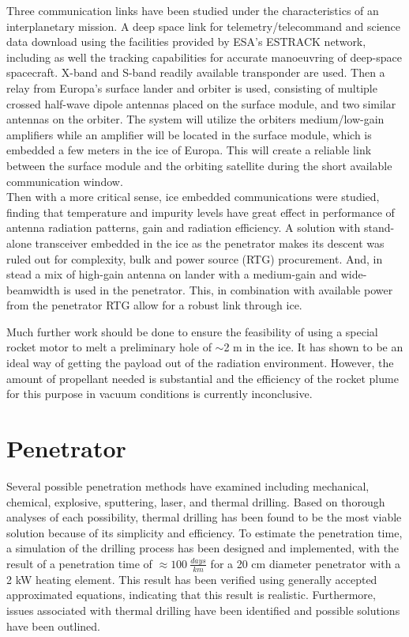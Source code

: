 Three communication links have been studied under the characteristics of an interplanetary mission. A deep space link for telemetry/telecommand and science data download using the facilities provided by ESA's ESTRACK network, including as well the tracking capabilities for accurate manoeuvring of deep-space spacecraft. X-band and S-band readily available transponder are used. Then a relay from Europa's surface lander and orbiter is used, consisting of multiple crossed half-wave dipole antennas placed on the surface module, and two similar antennas on the orbiter. The system will utilize the orbiters medium/low-gain amplifiers while an amplifier will be located in the surface module, which is embedded a few meters in the ice of Europa. This will create a reliable link between the surface module and the orbiting satellite during the short available communication window.
\\
Then with a more critical sense, ice embedded communications were studied, finding that temperature and impurity levels have great effect in performance of antenna radiation patterns, gain and radiation efficiency. A solution with stand-alone transceiver embedded in the ice as the penetrator makes its descent was ruled out for complexity, bulk and power source (RTG) procurement. And, in stead a mix of high-gain antenna on lander with a medium-gain and wide-beamwidth is used in the penetrator. This, in combination with available power from the penetrator RTG allow for a robust link through ice.

Much further work should be done to ensure the feasibility of using a special rocket motor to melt a preliminary hole of $\sim$2 m in the ice. It has shown to be an ideal way of getting the payload out of the radiation environment. However, the amount of propellant needed is substantial and the efficiency of the rocket plume for this purpose in vacuum conditions is currently inconclusive.

\section{Penetrator}
Several possible penetration methods have examined including mechanical, chemical, explosive, sputtering, laser, and thermal drilling. Based on thorough analyses of each possibility, thermal drilling has been found to be the most viable solution because of its simplicity and efficiency. To estimate the penetration time, a simulation of the drilling process has been designed and implemented, with the result of a penetration time of $\approx \SI{100}{\frac{days}{km}}$ for a 20 cm diameter penetrator with a 2 kW heating element. This result has been verified using generally accepted approximated equations, indicating that this result is realistic. Furthermore, issues associated with thermal drilling have been identified and possible solutions have been outlined.

